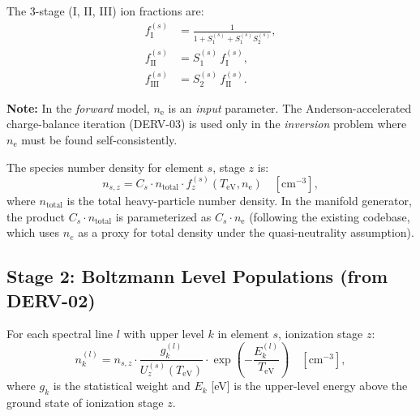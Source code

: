 \documentclass[11pt]{article}
\newcommand{\TeV}{T_\mathrm{eV}}
\newcommand{\ne}{n_\mathrm{e}}
\begin{document}
The 3-stage (I, II, III) ion fractions are:
\begin{align}
  f_\mathrm{I}^{(s)}   &= \frac{1}{1 + S_1^{(s)} + S_1^{(s)} S_2^{(s)}}, \label{eq:fI}\\
  f_\mathrm{II}^{(s)}  &= S_1^{(s)}\,f_\mathrm{I}^{(s)}, \label{eq:fII}\\
  f_\mathrm{III}^{(s)} &= S_2^{(s)}\,f_\mathrm{II}^{(s)}. \label{eq:fIII}
\end{align}

\textbf{Note:} In the \emph{forward} model, $\ne$ is an \emph{input} parameter.
The Anderson-accelerated charge-balance iteration (DERV-03) is used only in the
\emph{inversion} problem where $\ne$ must be found self-consistently.

The species number density for element $s$, stage $z$ is:
\begin{equation}
  \label{eq:n-species}
  n_{s,z} = C_s \cdot n_\mathrm{total} \cdot f_z^{(s)}(\TeV, \ne)
  \quad [\mathrm{cm}^{-3}],
\end{equation}
where $n_\mathrm{total}$ is the total heavy-particle number density. In the
manifold generator, the product $C_s \cdot n_\mathrm{total}$ is parameterized as
$C_s \cdot \ne$ (following the existing codebase, which uses $n_e$ as a proxy
for total density under the quasi-neutrality assumption).

\subsection{Stage 2: Boltzmann Level Populations (from DERV-02)}
\label{sec:stage2}

For each spectral line $l$ with upper level $k$ in element $s$,
ionization stage $z$:
\begin{equation}
  \label{eq:boltzmann-pop}
  n_k^{(l)} = n_{s,z} \cdot \frac{g_k^{(l)}}{U_z^{(s)}(\TeV)}
    \cdot \exp\!\left(-\frac{E_k^{(l)}}{\TeV}\right)
  \quad [\mathrm{cm}^{-3}],
\end{equation}
where $g_k$ is the statistical weight and $E_k$ [eV] is the upper-level
energy above the ground state of ionization stage $z$.
\end{document}
